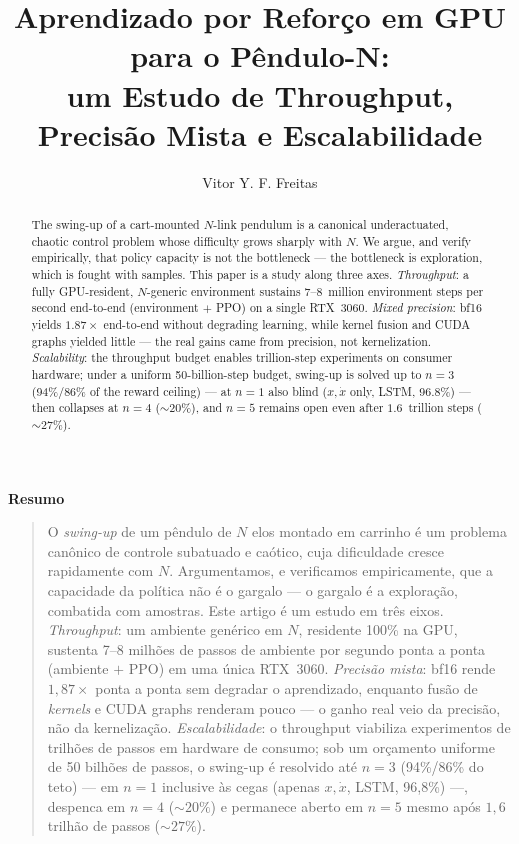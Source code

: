\documentclass[12pt]{article}
\title{Aprendizado por Reforço em GPU para o Pêndulo-N:\\ um Estudo de Throughput, Precisão Mista e Escalabilidade}
\author{Vitor Y. F. Freitas\inst{1}}
\newenvironment{resumo}{\begin{center}\textbf{Resumo}\end{center}\begin{quotation}\small}{\end{quotation}}%
\begin{document}
\maketitle

\begin{abstract}
The swing-up of a cart-mounted $N$-link pendulum is a canonical underactuated,
chaotic control problem whose difficulty grows sharply with $N$. We argue, and
verify empirically, that policy capacity is not the bottleneck --- the
bottleneck is exploration, which is fought with samples. This paper is a study
along three axes. \emph{Throughput}: a fully GPU-resident, $N$-generic
environment sustains 7--8~million environment steps per second end-to-end
(environment $+$ PPO) on a single RTX~3060. \emph{Mixed precision}: bf16
yields $1.87\times$ end-to-end without degrading learning, while kernel fusion
and CUDA graphs yielded little --- the real gains came from precision, not
kernelization.
\emph{Scalability}: the throughput budget enables trillion-step experiments on
consumer hardware; under a uniform 50-billion-step budget, swing-up is solved
up to $n{=}3$ (94\%/86\% of the reward ceiling) --- at $n{=}1$ also blind
($x,\dot{x}$ only, LSTM, 96.8\%) --- then collapses at $n{=}4$ (${\sim}20\%$),
and $n{=}5$ remains open even after $1.6$~trillion steps (${\sim}27\%$).
\end{abstract}

\begin{resumo}
O \emph{swing-up} de um pêndulo de $N$ elos montado em carrinho é um problema
canônico de controle subatuado e caótico, cuja dificuldade cresce rapidamente
com $N$. Argumentamos, e verificamos empiricamente, que a capacidade da
política não é o gargalo --- o gargalo é a exploração, combatida com amostras.
Este artigo é um estudo em três eixos. \emph{Throughput}: um ambiente genérico
em $N$, residente 100\% na GPU, sustenta 7--8 milhões de passos de ambiente
por segundo ponta a ponta (ambiente $+$ PPO) em uma única RTX~3060.
\emph{Precisão mista}: bf16 rende $1{,}87\times$ ponta a ponta sem degradar o
aprendizado, enquanto fusão de \emph{kernels} e CUDA graphs renderam pouco ---
o ganho real veio da precisão, não da kernelização. \emph{Escalabilidade}: o throughput viabiliza
experimentos de trilhões de passos em hardware de consumo; sob um orçamento
uniforme de 50 bilhões de passos, o swing-up é resolvido até $n{=}3$
(94\%/86\% do teto) --- em $n{=}1$ inclusive às cegas (apenas $x,\dot{x}$,
LSTM, 96,8\%) ---, despenca em $n{=}4$ (${\sim}20\%$) e permanece aberto em
$n{=}5$ mesmo após $1{,}6$ trilhão de passos (${\sim}27\%$).
\end{resumo}
\end{document}
